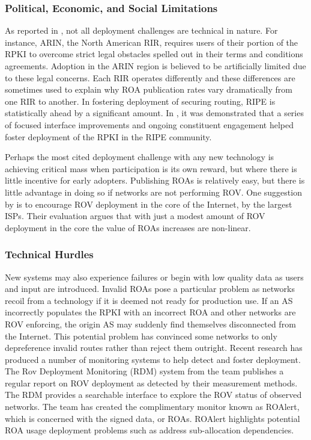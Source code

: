 \documentclass[sigconf]{acmart}
\begin{document}
\subsubsection{Political, Economic, and Social Limitations}

As reported in \cite{yoo_lowering_2018}, not all deployment challenges
are technical in nature.  For instance, ARIN, the North American RIR,
requires users of their portion of the RPKI to overcome strict legal
obstacles spelled out in their terms and conditions agreements.
Adoption in the ARIN region is believed to be artificially limited due to
these legal concerns.  Each RIR operates differently and these
differences are sometimes used to explain why ROA publication rates vary
dramatically from one RIR to another.  In fostering deployment of
securing routing, RIPE is statistically ahead by a significant amount.
In \cite{alex_band_ripe_2015}, it was demonstrated that a series of
focused interface improvements and ongoing constituent engagement helped
foster deployment of the RPKI in the RIPE community.

Perhaps the most cited deployment challenge with any new technology is
achieving critical mass when participation is its own reward, but where
there is little incentive for early adopters.  Publishing ROAs is
relatively easy, but there is little advantage in doing so if networks
are not performing ROV.  One suggestion by \cite{gilad_are_2017} is to
encourage ROV deployment in the core of the Internet, by the largest
ISPs.  Their evaluation argues that with just a modest amount of ROV
deployment in the core the value of ROAs increases are non-linear.

\subsubsection{Technical Hurdles}

New systems may also experience failures or begin with low quality data
as users and input are introduced.  Invalid ROAs pose a particular
problem as networks recoil from a technology if it is deemed not ready
for production use.  If an AS incorrectly populates the RPKI with an
incorrect ROA and other networks are ROV enforcing, the origin AS may
suddenly find themselves disconnected from the Internet.  This potential
problem has convinced some networks to only depreference invalid routes
rather than reject them outright.  Recent research has produced a number
of monitoring systems to help detect and foster deployment.  The Rov
Deployment Monitoring (RDM) system from the \cite{reuter_towards_2018}
team publishes a regular report on ROV deployment as detected by their
measurement methods.  The RDM provides a searchable interface to explore
the ROV status of observed networks.  The \cite{gilad_are_2017} team has
created the complimentary monitor known as ROAlert, which is concerned
with the signed data, or ROAs.  ROAlert highlights potential ROA usage
deployment problems such as address sub-allocation dependencies.
\end{document}
